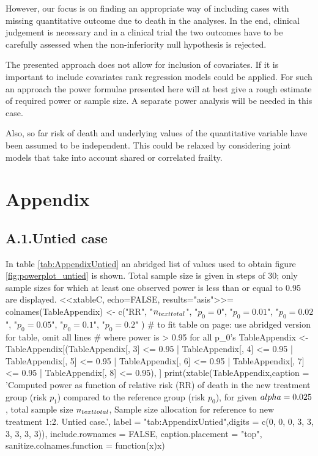 \documentclass[bimj,fleqn]{w-art}
\theoremstyle{plain}
\theoremstyle{definition}
\begin{document}
However, our focus is on finding an appropriate way of including cases with
missing quantitative outcome due to death in the analyses. In the end, clinical
judgement is necessary and in a clinical trial the two outcomes have to be
carefully assessed when the non-inferiority null hypothesis is rejected.

The presented approach does not allow for inclusion of covariates. If it is
important to include covariates rank regression models could be applied.
For such an approach the power formulae presented here will at best give a rough
estimate of required power or sample size. A separate power analysis will be
needed in this case.

Also, so far risk of death and underlying values of the quantitative variable
have been assumed to be independent. This could be relaxed by considering joint
models that take into account shared or correlated frailty.

\section*{Appendix}
\subsection*{A.1.\enspace Untied case}
In table \ref{tab:AppendixUntied} an abridged list of values used to obtain
figure \ref{fig:powerplot_untied} is shown. Total sample size is given in steps
of 30; only sample sizes for which at least one observed power is less than or
equal to 0.95 are displayed.
<<xtableC, echo=FALSE, results="asis">>=
colnames(TableAppendix) <- c("RR", "$n_{\\text{total}}$",
                             "$p_0 = 0$",
                             "$p_0 = 0.01$",
                             "$p_0 = 0.02$",
                             "$p_0 = 0.05$",
                             "$p_0 = 0.1$",
                             "$p_0 = 0.2$"
                             )
# to fit table on page: use abridged version for table, omit all lines
# where power is > 0.95 for all p_0's
TableAppendix <- TableAppendix[(TableAppendix[, 3] <= 0.95 |
                                  TableAppendix[, 4] <= 0.95 |
                                  TableAppendix[, 5] <= 0.95 |
                                  TableAppendix[, 6] <= 0.95 |
                                  TableAppendix[, 7] <= 0.95 |
                                  TableAppendix[, 8] <= 0.95), ]
print(xtable(TableAppendix,caption = 'Computed power as function of relative risk
             (RR) of death in the new treatment group (risk $p_1$) compared to
             the reference group (risk $p_0$), for given $\\alpha =0.025$,
             total sample size $n_{\\text{total}}$, Sample size allocation for
             reference to new treatment 1:2. Untied case.',
             label = "tab:AppendixUntied",digits = c(0, 0, 0, 3, 3, 3, 3, 3, 3)),
      include.rownames = FALSE,
      caption.placement = "top",
      sanitize.colnames.function = function(x){x})
\end{document}
